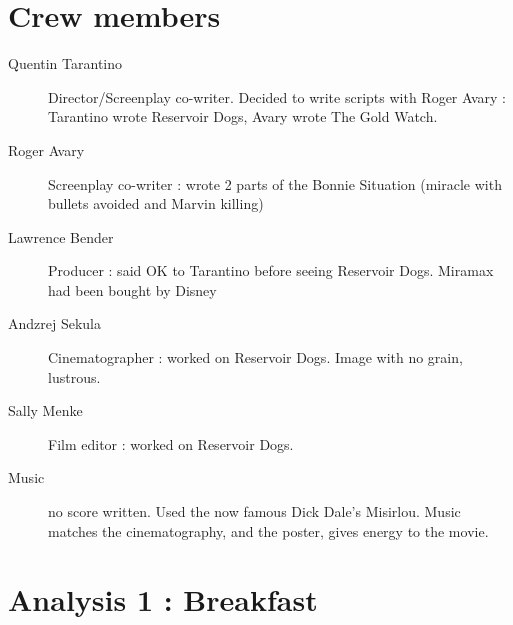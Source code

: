 \documentclass[a4paper,12pt]{article}
\begin{document}
\section{Crew members}

\begin{description}
	\item[Quentin Tarantino] Director/Screenplay co-writer. Decided to write scripts
with Roger Avary : Tarantino wrote Reservoir Dogs, Avary wrote The Gold Watch.
	\item[Roger Avary] Screenplay co-writer : wrote 2 parts of the Bonnie Situation
(miracle with bullets avoided and Marvin killing)
	\item[Lawrence Bender] Producer : said OK to Tarantino before seeing Reservoir Dogs.
Miramax had been bought by Disney
	\item[Andzrej Sekula] Cinematographer : worked on Reservoir Dogs. Image
with no grain, lustrous.
	\item[Sally Menke] Film editor : worked on Reservoir Dogs.
	\item[Music] no score written. Used the now famous Dick Dale's Misirlou.
Music matches the cinematography, and the poster, gives energy to the movie.
\end{description}

\section{Analysis 1 : Breakfast}
\end{document}
